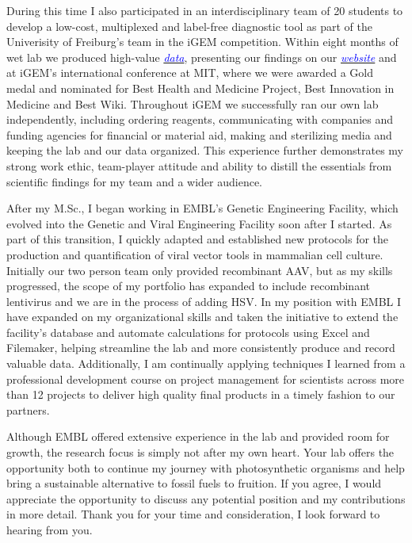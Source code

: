 \documentclass[11pt,a4paper,sans]{moderncv}
\begin{document}
\begin{spacing}{1.2}
During this time I also participated in an interdisciplinary team of 20 students to develop a low-cost, multiplexed and label-free diagnostic tool as part of the Univerisity of Freiburg's team in the iGEM competition.
Within eight months of wet lab we produced high-value {\href{https://www.ncbi.nlm.nih.gov/pubmed/29803867}{\textcolor{blue}{\textit{data}}}}, presenting our findings on our {\href{http://2015.igem.org/Team:Freiburg/Home_Intro}{\textcolor{blue}{\textit{website}}}} and at iGEM's international conference at MIT, where we were awarded a Gold medal and nominated for Best Health and Medicine Project, Best Innovation in Medicine and Best Wiki.
Throughout iGEM we successfully ran our own lab independently, including ordering reagents, communicating with companies and funding agencies for financial or material aid, making and sterilizing media and keeping the lab and our data organized. 
This experience further demonstrates my strong work ethic, team-player attitude and ability to distill the essentials from scientific findings for my team and a wider audience.\par\vspace*{3mm}
		
After my M.Sc., I began working in EMBL's Genetic Engineering Facility, which evolved into the Genetic and Viral Engineering Facility soon after I started. 
As part of this transition, I quickly adapted and established new protocols for the production and quantification of viral vector tools in mammalian cell culture. 			
Initially our two person team only provided recombinant AAV, but as my skills progressed, the scope of my portfolio has expanded to include recombinant lentivirus and we are in the process of adding HSV.
In my position with EMBL I have expanded on my organizational skills and taken the initiative to extend the facility's database and automate calculations for protocols using Excel and Filemaker, helping streamline the lab and more consistently produce and record valuable data.
Additionally, I am continually applying techniques I learned from a professional development course on project management for scientists across more than 12 projects to deliver high quality final products in a timely fashion to our partners.\par\vspace*{3mm}

Although EMBL offered extensive experience in the lab and provided room for growth, the research focus is simply not after my own heart.
Your lab offers the opportunity both to continue my journey with photosynthetic organisms and help bring a sustainable alternative to fossil fuels to fruition. 
If you agree, I would appreciate the opportunity to discuss any potential position and my contributions in more detail. 
Thank you for your time and consideration, I look forward to hearing from you.
 
\vspace{5mm}
\end{spacing}
\makeletterclosing
\end{document}
